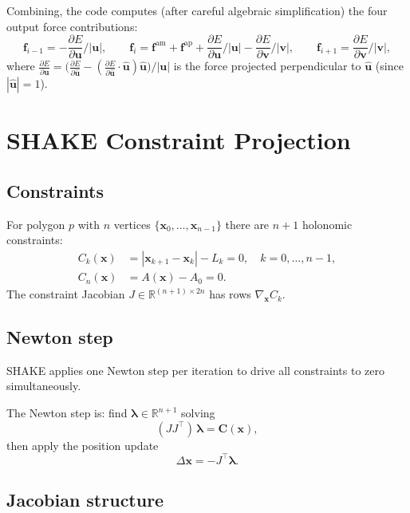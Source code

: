 \documentclass[12pt]{article}
\newcommand{\R}{\mathbb{R}}
\newcommand{\pderiv}[2]{\frac{\partial #1}{\partial #2}}
\newcommand{\uvec}{\hat{\mathbf{u}}}
\begin{document}
Combining, the code computes (after careful algebraic simplification) the four
output force contributions:
\[
  \mathbf{f}_{i-1} = -\pderiv{E}{\mathbf{u}} / |\mathbf{u}|, \qquad
  \mathbf{f}_i = \mathbf{f}^{\mathrm{am}} + \mathbf{f}^{\mathrm{ap}}
    + \pderiv{E}{\mathbf{u}}/|\mathbf{u}| - \pderiv{E}{\mathbf{v}}/|\mathbf{v}|, \qquad
  \mathbf{f}_{i+1} = \pderiv{E}{\mathbf{v}} / |\mathbf{v}|,
\]
where $\pderiv{E}{\mathbf{u}} = \bigl(\pderiv{E}{\hat{\mathbf{u}}} - (\pderiv{E}{\hat{\mathbf{u}}}\cdot\uvec)\uvec\bigr)/|\mathbf{u}|$
is the force projected perpendicular to $\uvec$ (since $|\hat{\mathbf{u}}|=1$).

\section{SHAKE Constraint Projection}

\subsection{Constraints}

For polygon $p$ with $n$ vertices $\{\mathbf{x}_0,\ldots,\mathbf{x}_{n-1}\}$ there are
$n+1$ holonomic constraints:
\begin{align}
  C_k(\mathbf{x}) &= |\mathbf{x}_{k+1} - \mathbf{x}_k| - L_k = 0, \quad k = 0,\ldots,n-1, \\
  C_n(\mathbf{x}) &= A(\mathbf{x}) - A_0 = 0.
\end{align}
The constraint Jacobian $J \in \R^{(n+1)\times 2n}$ has rows $\nabla_\mathbf{x} C_k$.

\subsection{Newton step}

SHAKE applies one Newton step per iteration to drive all constraints to zero simultaneously.

The Newton step is: find $\boldsymbol{\lambda} \in \R^{n+1}$ solving
\[
  (J J^\top)\,\boldsymbol{\lambda} = \mathbf{C}(\mathbf{x}),
\]
then apply the position update
\[
  \Delta\mathbf{x} = -J^\top\boldsymbol{\lambda}.
\]

\subsection{Jacobian structure}
\end{document}
